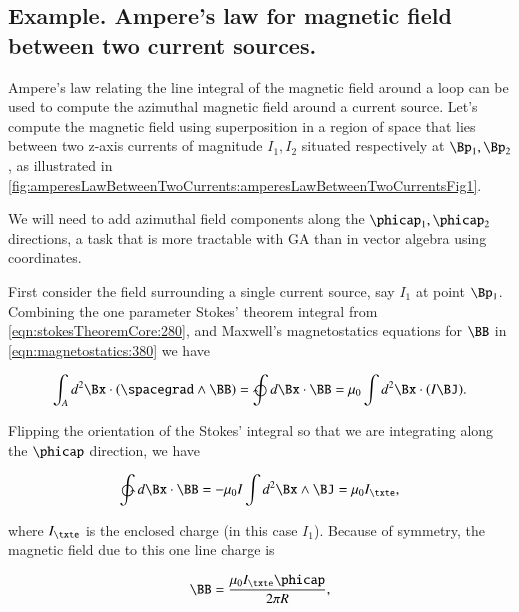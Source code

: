 %
%
\subsection{Example.  Ampere's law for magnetic field between two current sources.}

Ampere's law relating the line integral of the magnetic field around a loop can be used to compute the azimuthal magnetic field around a current source.  Let's compute the magnetic field using superposition in a region of space that lies between two z-axis currents of magnitude \( I_1, I_2 \) situated respectively at \( \Bp_1, \Bp_2 \), as illustrated in
\cref{fig:amperesLawBetweenTwoCurrents:amperesLawBetweenTwoCurrentsFig1}.


We will need to add azimuthal field components along the \( \phicap_1, \phicap_2 \) directions, a task that is more tractable with GA than in vector algebra using coordinates.

First consider the field surrounding a single current source, say \( I_1 \) at point \( \Bp_1 \).  Combining the one parameter Stokes' theorem integral from \cref{eqn:stokesTheoremCore:280}, and Maxwell's magnetostatics equations for \( \BB \) in \cref{eqn:magnetostatics:380} we have

\begin{dmath}\label{eqn:maxwells:20}
\int_A d^2 \Bx \cdot (\spacegrad \wedge \BB) = \ointclockwise d\Bx \cdot \BB = \mu_0 \int d^2 \Bx \cdot (I \BJ).
\end{dmath}

Flipping the orientation of the Stokes' integral so that we are integrating along the \( \phicap \) direction, we have

\begin{dmath}\label{eqn:maxwells:40}
\ointctrclockwise d\Bx \cdot \BB
= -\mu_0 I \int d^2 \Bx \wedge \BJ
= \mu_0 I_\txte,
\end{dmath}

where \( I_\txte \) is the enclosed charge (in this case \( I_1 \)).  Because of symmetry, the magnetic field due to this one line charge is

\begin{dmath}\label{eqn:maxwells:60}
\BB
= \frac{\mu_0 I_\txte \phicap}{2 \pi R},
\end{dmath}

